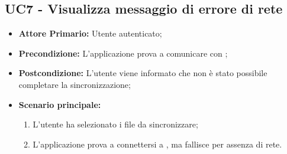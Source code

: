 \subsection{UC7 - Visualizza messaggio di errore di rete}
\label{UC7}
\begin{itemize}
\item \textbf{Attore Primario:} Utente autenticato;
\item \textbf{Precondizione:} L'applicazione prova a comunicare con ;
\item \textbf{Postcondizione:} L'utente viene informato che non è stato possibile completare la sincronizzazione;
\item \textbf{Scenario principale:}
    \begin{enumerate}
    \item L'utente ha selezionato i file da sincronizzare;
    \item L'applicazione prova a connettersi a , ma fallisce per assenza di rete.
    \end{enumerate}
\end{itemize}